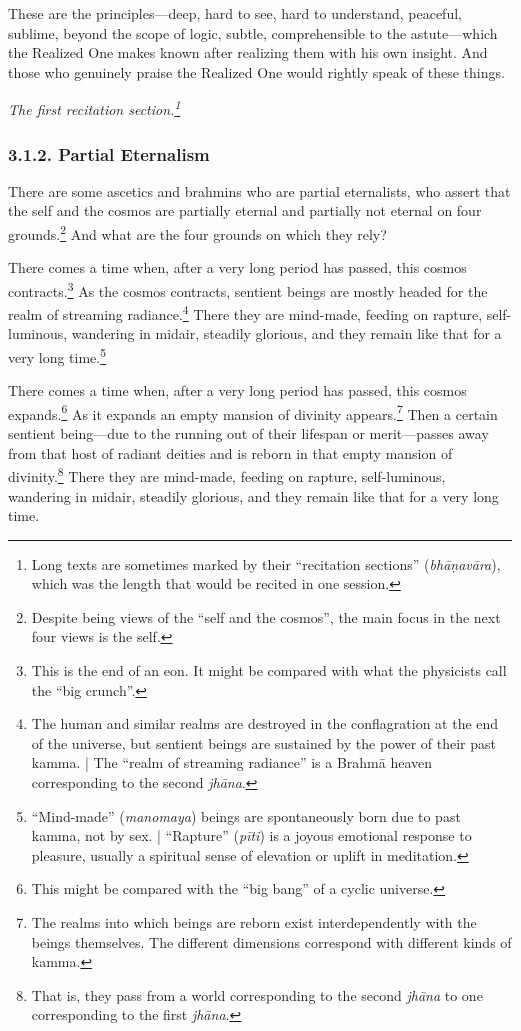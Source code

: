 \documentclass[12pt,openany]{book}%
\newcommand*{\scendsection}[1]{\begin{Center}\begin{small}\textit{#1}\end{small}\end{Center}\addvspace{1em}}
\begin{document}
These are the principles—deep, hard to see, hard to understand, peaceful, sublime, beyond the scope of logic, subtle, comprehensible to the astute—which the Realized One makes known after realizing them with his own insight. And those who genuinely praise the Realized One would rightly speak of these things. 

\scendsection{The first recitation section.\footnote{Long texts are sometimes marked by their “recitation sections” (\textit{\textsanskrit{bhāṇavāra}}), which was the length that would be recited in one session. } }

\subsubsection*{3.1.2. Partial Eternalism }

There are some ascetics and brahmins who are partial eternalists, who assert that the self and the cosmos are partially eternal and partially not eternal on four grounds.\footnote{Despite being views of the “self and the cosmos”, the main focus in the next four views is the self. } And what are the four grounds on which they rely? 

There comes a time when, after a very long period has passed, this cosmos contracts.\footnote{This is the end of an eon. It might be compared with what the physicists call the “big crunch”. } As the cosmos contracts, sentient beings are mostly headed for the realm of streaming radiance.\footnote{The human and similar realms are destroyed in the conflagration at the end of the universe, but sentient beings are sustained by the power of their past kamma. | The “realm of streaming radiance” is a \textsanskrit{Brahmā} heaven corresponding to the second \textit{\textsanskrit{jhāna}}. } There they are mind-made, feeding on rapture, self-luminous, wandering in midair, steadily glorious, and they remain like that for a very long time.\footnote{“Mind-made” (\textit{manomaya}) beings are spontaneously born due to past kamma, not by sex. | “Rapture” (\textit{\textsanskrit{pīti}}) is a joyous emotional response to pleasure, usually a spiritual sense of elevation or uplift in meditation. } 

There comes a time when, after a very long period has passed, this cosmos expands.\footnote{This might be compared with the “big bang” of a cyclic universe. } As it expands an empty mansion of divinity appears.\footnote{The realms into which beings are reborn exist interdependently with the beings themselves. The different dimensions correspond with different kinds of kamma. } Then a certain sentient being—due to the running out of their lifespan or merit—passes away from that host of radiant deities and is reborn in that empty mansion of divinity.\footnote{That is, they pass from a world corresponding to the second \textit{\textsanskrit{jhāna}} to one corresponding to the first \textit{\textsanskrit{jhāna}}. } There they are mind-made, feeding on rapture, self-luminous, wandering in midair, steadily glorious, and they remain like that for a very long time. 
\end{document}
